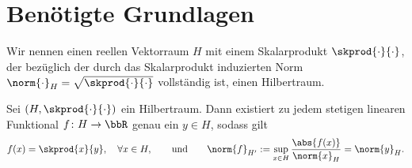 
\section{Benötigte Grundlagen} %
\label{sec:benoetigte_grundlagen}

\begin{Definition}[Hilbertraum]
    \label{def:hilbertraum}
    Wir nennen einen reellen Vektorraum $H$ mit einem Skalarprodukt $\skprod{\cdot}{\cdot}$, der bezüglich der durch das Skalarprodukt induzierten Norm $\norm{\cdot}_H = \sqrt{\skprod{\cdot}{\cdot}}$ vollständig ist, einen Hilbertraum.
\end{Definition}


\begin{Satz}
    \label{satz:rieszscher_darstellungssatz}
    Sei $(H, \skprod{\cdot}{\cdot})$ ein Hilbertraum. Dann existiert zu jedem stetigen linearen Funktional $f \colon H \to \bbR$ genau ein $y \in H$, sodass gilt
    \begin{equation}
        f(x) = \skprod{x}{y}, \quad \forall x \in H, \qquad \text{und} \qquad \norm{f}_{H'} := \sup_{x \in H} \frac{\abs{f(x)}}{\norm{x}_H} = \norm{y}_H.
    \end{equation}
\end{Satz}




